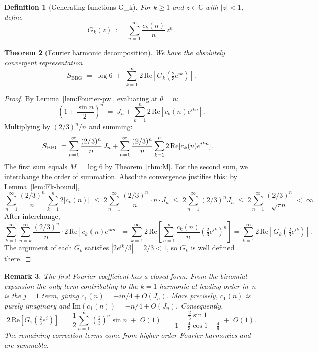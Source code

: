 \documentclass[12pt]{amsart}
\newtheorem{theorem}{Theorem}[section]
\newtheorem{definition}[theorem]{Definition}
\newtheorem{remark}[theorem]{Remark}
\newcommand{\C}{\mathbb{C}}
\begin{document}
\begin{definition}[Generating functions G\_k]\label{def:Gk}
For $k\ge 1$ and $z\in\C$ with $|z|<1$, define
\[
  G_k(z) \;:=\; \sum_{n=1}^{\infty} \frac{c_k(n)}{n}\,z^n.
\]
\end{definition}

\begin{theorem}[Fourier harmonic decomposition]\label{thm:fourier}
We have the absolutely convergent representation
\begin{equation}\label{eq:fourier-decomp}
  S_{\mathrm{BBG}} \;=\; \log 6
    \;+\; \sum_{k=1}^{\infty}
          2\,\mathrm{Re}\!\left[G_k\!\!\left(\tfrac{2}{3}e^{ik}\right)\right].
\end{equation}
\end{theorem}

\begin{proof}
By Lemma~\ref{lem:Fourier-pw}, evaluating at $\theta=n$:
\[
  \left(1+\frac{\sin n}{2}\right)^{\!n}
  \;=\; J_n + \sum_{k=1}^{n}2\,\mathrm{Re}[c_k(n)e^{ikn}].
\]
Multiplying by $(2/3)^n/n$ and summing:
\begin{align}
  S_{\mathrm{BBG}}
  &= \sum_{n=1}^{\infty}\frac{(2/3)^n}{n}\,J_n
   + \sum_{n=1}^{\infty}\frac{(2/3)^n}{n}
     \sum_{k=1}^{n}2\,\mathrm{Re}[c_k(n)e^{ikn}]. \notag
\end{align}
The first sum equals $M=\log 6$ by Theorem~\ref{thm:M}.
For the second sum, we interchange the order of summation.
Absolute convergence justifies this: by Lemma~\ref{lem:Fk-bound},
\[
  \sum_{n=1}^{\infty}\frac{(2/3)^n}{n}\sum_{k=1}^{n}2|c_k(n)|
  \;\le\; 2\sum_{n=1}^{\infty}\frac{(2/3)^n}{n}\cdot n\cdot J_n
  \;\le\; 2\sum_{n=1}^{\infty}(2/3)^n J_n
  \;\le\; 2\sum_{n=1}^{\infty}\frac{(2/3)^n}{\sqrt{\pi n}}
  \;< \;\infty.
\]
After interchange,
\[
  \sum_{k=1}^{\infty}\sum_{n=k}^{\infty}
  \frac{(2/3)^n}{n}\cdot 2\,\mathrm{Re}[c_k(n)e^{ikn}]
  = \sum_{k=1}^{\infty}
    2\,\mathrm{Re}\!\left[\sum_{n=1}^{\infty}
    \frac{c_k(n)}{n}\!\left(\tfrac{2}{3}e^{ik}\right)^{\!n}\right]
  = \sum_{k=1}^{\infty}
    2\,\mathrm{Re}\!\left[G_k\!\!\left(\tfrac{2}{3}e^{ik}\right)\right].
\]
The argument of each $G_k$ satisfies $|{2e^{ik}}/{3}|=2/3<1$, so
$G_k$ is well defined there.
\end{proof}

\begin{remark}\label{rem:G1-closed}
The first Fourier coefficient has a closed form.
From the binomial expansion the only term contributing to the
$k=1$ harmonic at leading order in~$n$ is the $j=1$ term,
giving $c_1(n)=-in/4+O(J_n)$.  More precisely,
$c_1(n)$ is purely imaginary and $\mathrm{Im}(c_1(n))=-n/4+O(J_n)$.
Consequently,
\[
  2\,\mathrm{Re}\!\left[G_1\!\!\left(\tfrac{2}{3}e^{i}\right)\right]
  \;=\; \frac{1}{2}\sum_{n=1}^{\infty}
        \!\left(\tfrac{2}{3}\right)^{\!n}\sin n \;+\; O(1)
  \;=\; \frac{\tfrac{2}{3}\sin 1}
             {1-\tfrac{4}{3}\cos 1+\tfrac{4}{9}}
  \;+\; O(1).
\]
The remaining correction terms come from higher-order Fourier
harmonics and are summable.
\end{remark}
\end{document}
